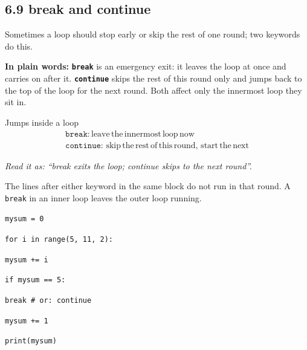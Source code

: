 \documentclass[11pt]{article}
\begin{document}
\begin{keepsection}
\section{6.9 break and continue}

Sometimes a loop should stop early or skip the rest of one round; two keywords do this.

\begin{plainbox}\textbf{In plain words:} \textbf{\texttt{break}} is an emergency exit: it leaves the loop at once and carries on after it. \textbf{\texttt{continue}} skips the rest of this round only and jumps back to the top of the loop for the next round. Both affect only the innermost loop they sit in.\end{plainbox}

\begin{equationcard}{Jumps inside a loop}
\[ \begin{gathered} \texttt{break}:\, \text{leave}\, \text{the}\, \text{innermost}\, \text{loop}\, \text{now} \\ \texttt{continue}:\, \text{skip}\, \text{the}\, \text{rest}\, \text{of}\, \text{this}\, \text{round},\, \text{start}\, \text{the}\, \text{next} \end{gathered} \]
{\small \emph{Read it as: “break exits the loop; continue skips to the next round”.}\par  The lines after either keyword in the same block do not run in that round. A \texttt{break} in an inner loop leaves the outer loop running.}
\end{equationcard}
\begin{tcolorbox}[colback=Paperblue,colframe=Paperblue,boxrule=0pt,arc=0pt,left=7pt,right=7pt,top=5pt,bottom=5pt]\small\sloppy
\noindent\hspace*{0em}\texttt{mysum = 0}\par
\noindent\hspace*{0em}\texttt{for i in range(5, 11, 2):}\par
\noindent\hspace*{1em}\texttt{mysum += i}\par
\noindent\hspace*{1em}\texttt{if mysum == 5:}\par
\noindent\hspace*{3em}\texttt{break \# or: continue}\par
\noindent\hspace*{1em}\texttt{mysum += 1}\par
\noindent\hspace*{0em}\texttt{print(mysum)}\par
\end{tcolorbox}


\end{keepsection}
\end{document}

